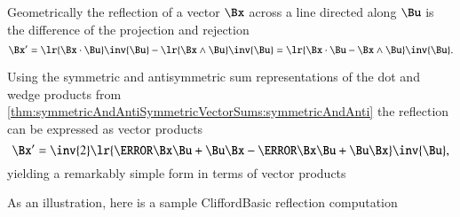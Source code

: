 %
%

Geometrically the reflection of a vector \( \Bx \) across a line directed along \( \Bu \) is the difference of the projection and rejection
\begin{dmath}\label{eqn:reflection:900}
\Bx'
= \lr{ \Bx \cdot \Bu } \inv{\Bu} - \lr{ \Bx \wedge \Bu } \inv{\Bu }
= \lr{ \Bx \cdot \Bu - \Bx \wedge \Bu } \inv{\Bu }.
\end{dmath}

Using the symmetric and antisymmetric sum representations of the dot and wedge products from
\cref{thm:symmetricAndAntiSymmetricVectorSums:symmetricAndAnti}
the reflection can be expressed as vector products
\begin{dmath}\label{eqn:reflection:940}
\Bx'
= \inv{2} \lr{ \cancel{\Bx \Bu} + \Bu \Bx - \cancel{\Bx \Bu} + \Bu \Bx } \inv{\Bu },
\end{dmath}
yielding a remarkably simple form in terms of vector products

As an illustration, here is a sample CliffordBasic reflection computation


